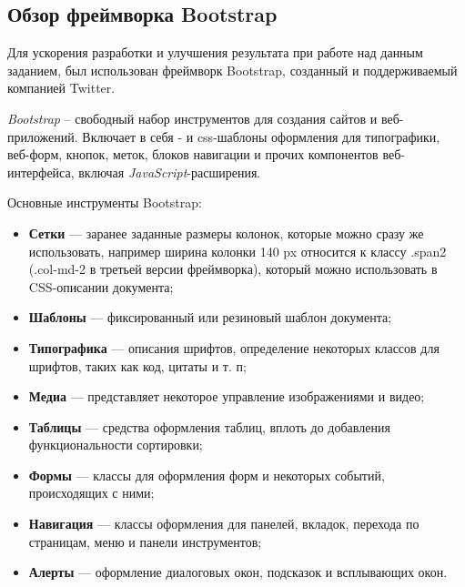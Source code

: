 \subsection{Обзор фреймворка Bootstrap}\label{theory:bootstrap}

Для ускорения разработки и улучшения результата при работе над данным заданием, был использован фреймворк Bootstrap, созданный и поддерживаемый компанией Twitter.

\textit{Bootstrap} -- свободный набор инструментов для создания сайтов и веб-приложений. Включает в себя - и \gls{css}-шаблоны оформления для типографики, веб-форм, кнопок, меток, блоков навигации и прочих компонентов веб-интерфейса, включая \textit{JavaScript}-расширения. 

Основные инструменты Bootstrap:
\begin{itemize}
	\item \textbf{Сетки} — заранее заданные размеры колонок, которые можно сразу же использовать, например ширина колонки 140 px относится к классу .span2 (.col-md-2 в третьей версии фреймворка), который можно использовать в CSS-описании документа;
	\item \textbf{Шаблоны} — фиксированный или резиновый шаблон документа;
	\item \textbf{Типографика} — описания шрифтов, определение некоторых классов для шрифтов, таких как код, цитаты и т. п;
	\item \textbf{Медиа} — представляет некоторое управление изображениями и видео;
	\item \textbf{Таблицы} — средства оформления таблиц, вплоть до добавления функциональности сортировки;
	\item \textbf{Формы} — классы для оформления форм и некоторых событий, происходящих с ними;
	\item \textbf{Навигация} — классы оформления для панелей, вкладок, перехода по страницам, меню и панели инструментов;
	\item \textbf{Алерты} — оформление диалоговых окон, подсказок и всплывающих окон.
\end{itemize}